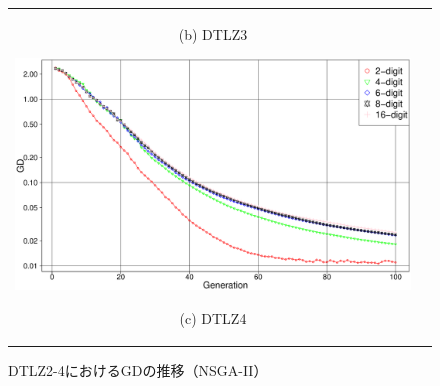 \documentclass[../main/main]{subfiles}
\begin{document}
\begin{description}
\begin{figure}[h]
\begin{tabular}{cc}
\begin{minipage}{0.32\hsize}
\begin{center}
{\footnotesize (b) DTLZ3}
\end{center}
\end{minipage}
\begin{minipage}{0.32\hsize}
\includegraphics[width=1\linewidth]{../figures/DTLZ4_GD.eps}
\begin{center}
{\footnotesize (c) DTLZ4}
\end{center}
\end{minipage}
\end{tabular}
\caption{DTLZ2-4におけるGDの推移（NSGA-II）}
\label{fig:gd}
\end{figure}



\end{description}
\end{document}
